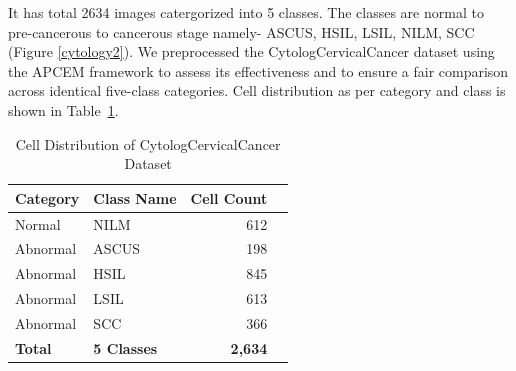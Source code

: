 \documentclass[pdflatex,sn-nature]{sn-jnl}%
\theoremstyle{thmstyleone}%
\theoremstyle{thmstyletwo}%
\theoremstyle{thmstylethree}%
\begin{document}
It has total 2634 images catergorized into 5 classes. The classes are normal to pre-cancerous to cancerous stage namely- ASCUS, HSIL, LSIL, NILM, SCC (Figure \ref{cytology2}). We preprocessed the CytologCervicalCancer dataset using the APCEM framework to assess its effectiveness and to ensure a fair comparison across identical five-class categories. Cell distribution as per category and class is shown in Table~\ref{tab:cell_distribution_cytolog}.

\begin{table}[htbp]
    \centering
    \caption{Cell Distribution of CytologCervicalCancer Dataset}
    \label{tab:cell_distribution_cytolog}
    \begin{tabular}{llrl}
        \toprule
        \textbf{Category} & \textbf{Class Name} & \textbf{Cell Count}  \\
        \midrule
        Normal   & NILM  & 612  \\
        Abnormal & ASCUS & 198  \\
        Abnormal & HSIL  & 845 \\
        Abnormal & LSIL  & 613  \\
        Abnormal & SCC   & 366  \\
        \midrule
        \textbf{Total} & \textbf{5 Classes} & \textbf{2,634} & \\
        \bottomrule
    \end{tabular}
\end{table}
\end{document}
